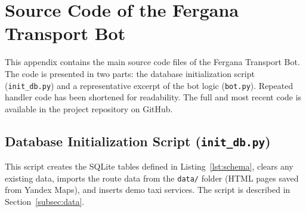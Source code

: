 \chapter{Source Code of the Fergana Transport Bot}
\label{app:source-code}

This appendix contains the main source code files of the Fergana Transport
Bot. The code is presented in two parts: the database initialization
script (\texttt{init\_db.py}) and a representative excerpt of the bot
logic (\texttt{bot.py}). Repeated handler code has been shortened for
readability. The full and most recent code is available in the project
repository on GitHub.

\section{Database Initialization Script (\texttt{init\_db.py})}
\label{app:init-db}

This script creates the SQLite tables defined in
Listing~\ref{lst:schema}, clears any existing data, imports the route
data from the \texttt{data/} folder (HTML pages saved from Yandex Maps),
and inserts demo taxi services. The script is described in
Section~\ref{subsec:data}.

